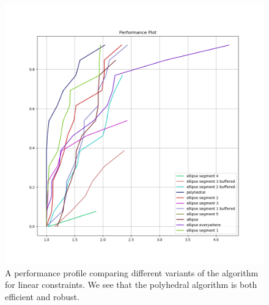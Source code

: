 \documentclass{article}
\begin{document}
	
\begin{figure}[ht]
    \centering
    \includegraphics[scale=0.4]{images/performance_profile_plot.png}
    \caption[A performance profile comparing variants of the algorithm for linear constraints.]{
    	A performance profile comparing different variants of the algorithm for linear constraints.
    	We see that the polyhedral algorithm is both efficient and robust.
    }
    \label{performance_profile_image}
\end{figure}







\end{document}
